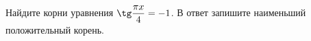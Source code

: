\begin{ex}
	\begin{condition}
		Найдите корни уравнения \( \tg\dfrac{\pi x}{4}=-1 \). В ответ запишите наименьший положительный корень.
	\end{condition}
	\answer{\(  \)}
\end{ex}